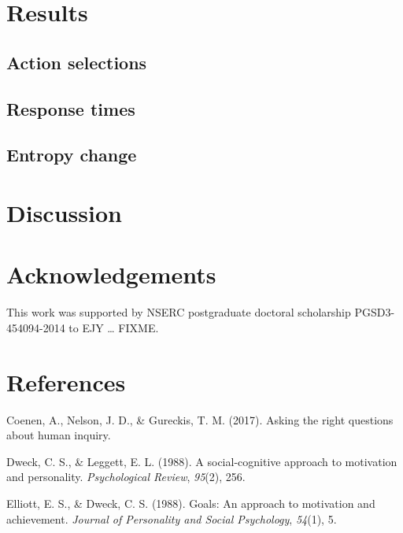 \documentclass[10pt, letterpaper]{article}
\begin{document}
\section{Results}\label{results}

\subsection{Action selections}\label{action-selections}

\subsection{Response times}\label{response-times}

\subsection{Entropy change}\label{entropy-change}

\section{Discussion}\label{discussion}

\section{Acknowledgements}\label{acknowledgements}

This work was supported by NSERC postgraduate doctoral scholarship
PGSD3-454094-2014 to EJY \ldots{} FIXME.

\section{References}\label{references}

\setlength{\parindent}{-0.1in} \setlength{\leftskip}{0.125in} \noindent

\hypertarget{refs}{}
\hypertarget{ref-coenen2017}{}
Coenen, A., Nelson, J. D., \& Gureckis, T. M. (2017). Asking the right
questions about human inquiry.

\hypertarget{ref-dweck1988}{}
Dweck, C. S., \& Leggett, E. L. (1988). A social-cognitive approach to
motivation and personality. \emph{Psychological Review}, \emph{95}(2),
256.

\hypertarget{ref-elliott1988}{}
Elliott, E. S., \& Dweck, C. S. (1988). Goals: An approach to motivation
and achievement. \emph{Journal of Personality and Social Psychology},
\emph{54}(1), 5.
\end{document}
